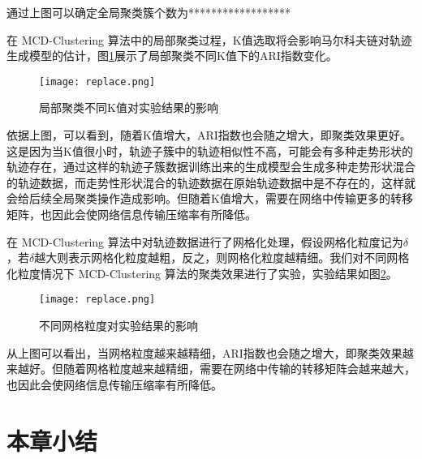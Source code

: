 通过上图可以确定全局聚类簇个数为******************

在 MCD-Clustering 算法中的局部聚类过程，K值选取将会影响马尔科夫链对轨迹生成模型的估计，图\ref{differentKJB}展示了局部聚类不同K值下的ARI指数变化。
\begin{figure}[h]
	\texttt{[image: replace.png]}
	\caption{局部聚类不同K值对实验结果的影响}
	\label{differentKJB}
\end{figure}

依据上图，可以看到，随着K值增大，ARI指数也会随之增大，即聚类效果更好。这是因为当K值很小时，轨迹子簇中的轨迹相似性不高，可能会有多种走势形状的轨迹存在，通过这样的轨迹子簇数据训练出来的生成模型会生成多种走势形状混合的轨迹数据，而走势性形状混合的轨迹数据在原始轨迹数据中是不存在的，这样就会给后续全局聚类操作造成影响。但随着K值增大，需要在网络中传输更多的转移矩阵，也因此会使网络信息传输压缩率有所降低。

在 MCD-Clustering 算法中对轨迹数据进行了网格化处理，假设网格化粒度记为$\delta$，若$\delta$越大则表示网格化粒度越粗，反之，则网格化粒度越精细。我们对不同网格化粒度情况下 MCD-Clustering 算法的聚类效果进行了实验，实验结果如图\ref{differentDELTA}。
\begin{figure}[h]
	\texttt{[image: replace.png]}
	\caption{不同网格粒度对实验结果的影响}
	\label{differentDELTA}
\end{figure}

从上图可以看出，当网格粒度越来越精细，ARI指数也会随之增大，即聚类效果越来越好。但随着网格粒度越来越精细，需要在网络中传输的转移矩阵会越来越大，也因此会使网络信息传输压缩率有所降低。


\section{本章小结}
